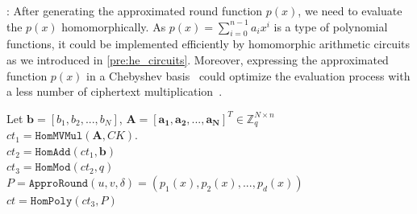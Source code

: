 :
After generating the approximated round function $p(x)$, we need to 
evaluate the $p(x)$ homomorphically.
As $p(x) =  {\textstyle \sum_{i=0}^{n-1}}a_ix^i $ is a type of 
polynomial functions, it could be implemented efficiently 
by homomorphic arithmetic circuits as we introduced in \cref{pre:he_circuits}.
Moreover, expressing the approximated function $p(x)$ 
in a Chebyshev basis~\cite{chebyshevbasis}
could optimize the evaluation process with a less 
number of ciphertext multiplication~\cite{
improvedboot, betterboot, ckksbootsparse, inverseboot, errorboot}.  

\begin{algorithm}[htbp]
    \caption{Homomorphic conversion \texttt{LWEsPack}}
    \label{algo: lwespack}
     Let $\mathbf{b} = [b_1, b_2, ...,b_N]$, 
     $\mathbf{A} = [\mathbf{a_1}, \mathbf{a_2}, ..., \mathbf{a_N}]^{T} \in \mathbb{Z}_{q}^{N \times n}$\\
     $ct_1 = \texttt{HomMVMul}(\mathbf{A},CK)$.
      \\
     $ct_2 = \texttt{HomAdd}(ct_1, \mathbf{b})$
      \\
     $ct_3 = \texttt{HomMod}(ct_2, q)$
      \\
     $P = \texttt{ApproRound}(u,v,\delta) = (p_1(x), p_2(x), ...,p_d(x))$ \\
     $ct = \texttt{HomPoly}(ct_3, P)$
      \\
\end{algorithm}



